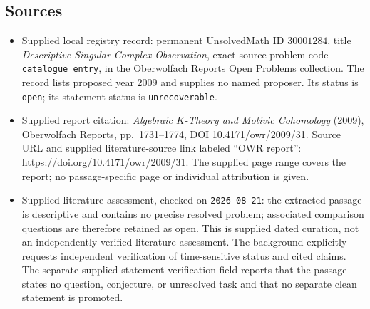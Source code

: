 \documentclass[11pt]{article}
\begin{document}
\subsection{Sources}
\begin{itemize}
\item Supplied local registry record: permanent UnsolvedMath ID \(30001284\), title \emph{Descriptive Singular-Complex Observation}, exact source problem code \texttt{catalogue entry}, in the Oberwolfach Reports Open Problems collection. The record lists proposed year 2009 and supplies no named proposer. Its status is \texttt{open}; its statement status is \texttt{unrecoverable}.
\item Supplied report citation: \emph{Algebraic \(K\)-Theory and Motivic Cohomology} (2009), Oberwolfach Reports, pp.\ 1731--1774, DOI 10.4171/owr/2009/31. Source URL and supplied literature-source link labeled ``OWR report'': \url{https://doi.org/10.4171/owr/2009/31}. The supplied page range covers the report; no passage-specific page or individual attribution is given.
\item Supplied literature assessment, checked on \texttt{2026-08-21}: the extracted passage is descriptive and contains no precise resolved problem; associated comparison questions are therefore retained as open. This is supplied dated curation, not an independently verified literature assessment. The background explicitly requests independent verification of time-sensitive status and cited claims. The separate supplied statement-verification field reports that the passage states no question, conjecture, or unresolved task and that no separate clean statement is promoted.
\end{itemize}
\end{document}
